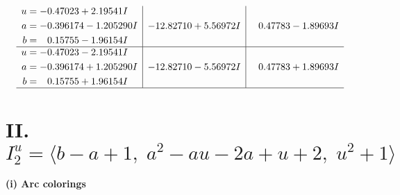 \documentclass[1p]{elsarticle_modified}
\theoremstyle{definition}
\begin{document}
$$\begin{array}{c|c|c}
\begin{aligned}
u &= -0.47023 + 2.19541 I \\
a &= -0.396174 - 1.205290 I \\
b &= \phantom{-}0.15755 - 1.96154 I\end{aligned}
 & -12.82710 + 5.56972 I & \phantom{-}0.47783 - 1.89693 I \\ \hline\begin{aligned}
u &= -0.47023 - 2.19541 I \\
a &= -0.396174 + 1.205290 I \\
b &= \phantom{-}0.15755 + 1.96154 I\end{aligned}
 & -12.82710 - 5.56972 I & \phantom{-}0.47783 + 1.89693 I\\
 \hline 
 \end{array}$$\newpage\newpage\renewcommand{\arraystretch}{1}
\centering \section*{II. $I^u_{2}= \langle b- a+1,\;a^2- a u-2 a+u+2,\;u^2+1 \rangle$}
\flushleft \textbf{(i) Arc colorings}\\
\end{document}
